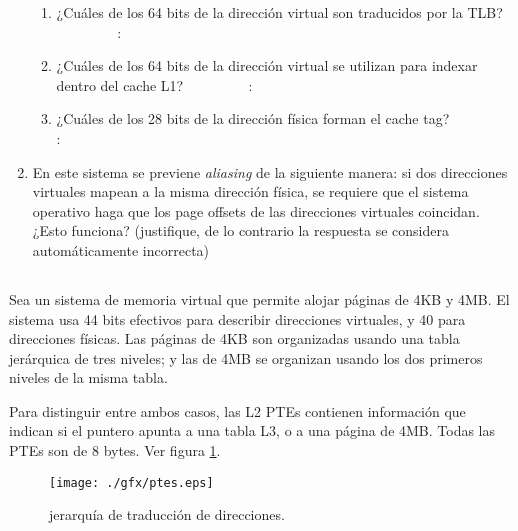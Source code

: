 \begin{enumerate}
	      \begin{enumerate}
	      \item ¿Cuáles de los 64 bits de la dirección virtual son traducidos 
		    por la TLB?
		    \underline{$\qquad\qquad$} : \underline{$\qquad\qquad$}
	      	      
	      \item ¿Cuáles de los 64 bits de la dirección virtual se utilizan para
		    indexar dentro del cache L1?
		    \underline{$\qquad\qquad$} : \underline{$\qquad\qquad$}
	      
	      \item ¿Cuáles de los 28 bits de la dirección fí­sica forman el cache tag?
		    \underline{$\qquad\qquad$} : \underline{$\qquad\qquad$}
	      	      
	      \end{enumerate}
	
	\item En este sistema se previene \emph{aliasing} de la
	      siguiente manera: si dos direcciones virtuales mapean a la misma
	      dirección fí­sica, se requiere que el sistema operativo haga que los
	      page offsets de las direcciones virtuales coincidan. ¿Esto funciona?
	      (justifique, de lo contrario la respuesta se considera automáticamente
	      incorrecta)
	
	\end{enumerate}

\subsection{}
    Sea un sistema de memoria virtual que permite alojar páginas de
    4KB y 4MB. El sistema usa 44 bits efectivos para describir direcciones
    virtuales, y 40 para direcciones físicas. Las páginas de 4KB son
    organizadas usando una tabla jerárquica de tres niveles; y las de 4MB
    se organizan usando los dos primeros niveles de la misma tabla.

    Para distinguir entre ambos casos, las L2 PTEs contienen información
    que indican si el puntero apunta a una tabla L3, o a una página de 4MB.
    Todas las PTEs son de 8 bytes. Ver figura \ref{fig::hier}.

    \begin{figure}[!ht]
    \centering
    \texttt{[image: ./gfx/ptes.eps]}
    \caption{jerarquía de traducción de direcciones.}
    \label{fig::hier}
    \end{figure}

